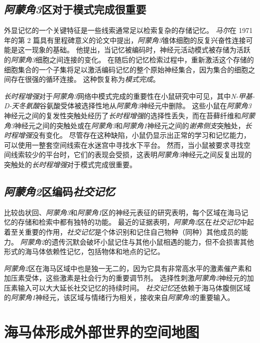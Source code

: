 \subsection{\textit{阿蒙角3}区对于模式完成很重要}

外显记忆的一个关键特征是一些线索通常足以检索复杂的存储记忆。
\textit{马尔}在 1971 年的第 2 篇具有里程碑意义的论文中提出，\textit{阿蒙角3}锥体细胞的反复兴奋性连接可能是这一现象的基础\cite{marr1991simple}。
他提出，当记忆被编码时，神经元活动模式被存储为活跃的\textit{阿蒙角3}细胞之间连接的变化。
在随后的记忆检索过程中，重新激活这个存储的细胞集合的一个子集将足以激活编码记忆的整个原始神经集合，因为集合的细胞之间存在很强的循环连接。
这种恢复称为\textit{模式完成}。


\textit{长时程增强}对于\textit{阿蒙角3}网络中模式完成的重要性在小鼠研究中可见，其中\textit{N-甲基-D-天冬氨酸}谷氨酸受体被选择性地从\textit{阿蒙角3}神经元中删除。
这些小鼠在\textit{阿蒙角3}神经元之间的复发性突触处经历了\textit{长时程增强}的选择性丢失，而在苔藓纤维和\textit{阿蒙角3}神经元之间的突触处或在\textit{阿蒙角3}和\textit{阿蒙角1}神经元之间的\textit{谢弗侧支}突触处，\textit{长时程增强}没有变化。
尽管存在这种缺陷，小鼠仍显示出正常的学习和记忆能力，可以使用一整套空间线索在水迷宫中寻找水下平台。
然而，当小鼠被要求寻找空间线索较少的平台时，它们的表现会受损，这表明\textit{阿蒙角3}神经元之间反复出现的突触处的\textit{长时程增强}对于模式完成很重要。



\subsection{\textit{阿蒙角2}区编码\textit{社交记忆}}

比较齿状回、\textit{阿蒙角3}和\textit{阿蒙角1}区的神经元表征的研究表明，每个区域在海马记忆的存储和检索中都有独特的功能。
最近的证据表明，\textit{阿蒙角2}区在\textit{社交记忆}中起着至关重要的作用，\textit{社交记忆}是个体识别和记住自己物种（同种）其他成员的能力。
\textit{阿蒙角2}的遗传沉默会破坏小鼠记住与其他小鼠相遇的能力，但不会损害其他形式的海马体依赖性记忆，包括物体和地点的记忆。


\textit{阿蒙角2}区在海马区域中也是独一无二的，因为它具有非常高水平的激素催产素和加压素受体，这些激素是社会行为的重要调节剂。
选择性刺激\textit{阿蒙角2}神经元的加压素输入可以大大延长社交记忆的持续时间。
\textit{社交记忆}还依赖于海马体腹侧区域的\textit{阿蒙角1}神经元，该区域与情绪行为相关，接收来自\textit{阿蒙角2}的重要输入。



\section{海马体形成外部世界的空间地图}

